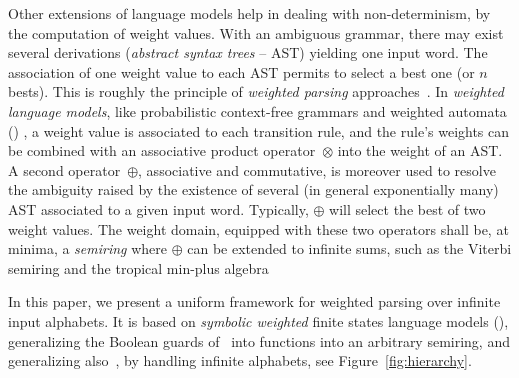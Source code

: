 Other extensions of language models  %
help in dealing with non-determinism, by the computation of weight values.
With an ambiguous grammar, there may exist several derivations
(\emph{abstract syntax trees} -- AST) %
yielding one input word. %
The association of one weight value %
to each AST permits to select a best one (or $n$ bests). %
This is roughly the principle of \emph{weighted parsing}
approaches~\cite{Goodman99SemiringParsing,Nederhof03weightedParsing,MorbitzVogler19weighted-parsing}.
In \emph{weighted language models},
like \eg probabilistic context-free grammars %
and weighted automata (\WA) \cite{Droste09handbook},
a weight value is associated to each transition rule, %
and the rule's weights can be combined with an
associative product operator~$\otimes$ into the weight of an AST.
A second operator~$\oplus$, associative and commutative,
is moreover used to resolve the ambiguity raised by the existence
of several (in general exponentially many) AST
associated to a given input word.
Typically, $\oplus$ will select the best of two weight values.
The weight domain, equipped with these two operators shall be, at minima,
a \emph{semiring} %
where $\oplus$ can be extended to infinite sums,
such as the Viterbi semiring and the tropical min-plus algebra%


In this paper, we present a uniform framework for weighted parsing over infinite input alphabets.
It is based on \emph{symbolic weighted} finite states language models (\swM),
generalizing the Boolean guards of~\SA %
into functions into an arbitrary semiring,
and generalizing also~\WA, by handling infinite alphabets, see Figure~\ref{fig:hierarchy}.


